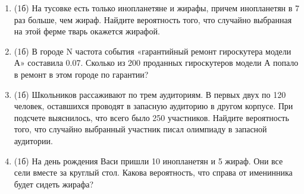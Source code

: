 \documentclass[a4paper, 12pt]{article}
\begin{document}
\begin{enumerate}
\item (1б) На тусовке есть только инопланетяне и жирафы, причем инопланетян в 7 раз больше, чем жираф. Найдите вероятность того, 
что случайно выбранная на этой ферме тварь окажется жирафой.

\item (1б) В городе N частота события «гарантийный ремонт гироскутера модели А» составила 0.07. 
Сколько из 200 проданных гироскутеров модели А попало в ремонт в этом городе по гарантии?

\item (1б) Школьников рассаживают по трем аудиториям. В первых двух по 120 человек, оставшихся проводят в запасную аудиторию в другом корпусе. 
При подсчете выяснилось, что всего было 250 участников. Найдите вероятность того, что случайно выбранный участник писал олимпиаду в запасной аудитории.

\item (1б) На день рождения Васи пришли 10 инопланетян и 5 жираф. Они все сели вместе за круглый стол. 
Какова вероятность, что справа от именинника будет сидеть жирафа? 



\end{enumerate}
\end{document}
